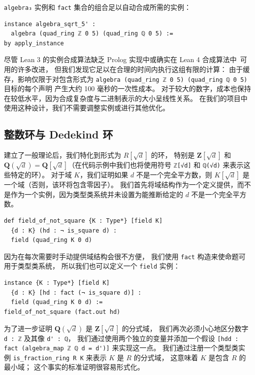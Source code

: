 \documentclass[sigplan,10pt,nonacm,
screen]{acmart} \settopmatter{printfolios=true,printccs=false,printacmref=false}
\newcommand{\QQ}{\mathbf{Q}}
\newcommand{\ZZ}{\mathbf{Z}}
\begin{document}
    \lstinline{algebra₃} 实例和 \lstinline{fact} 集合的组合足以自动合成所需的实例：
\begin{lstlisting}
instance algebra_sqrt_5' :
  algebra (quad_ring ℤ 0 5) (quad_ring ℚ 0 5) :=
by apply_instance
\end{lstlisting}
尽管 Lean 3 的实例合成算法缺乏 Prolog 实现中或确实在 Lean 4 合成算法中~\cite{lean-tabled-typeclasses}可用的许多改进，
但我们发现它足以在合理的时间内执行这组有限的计算：
由于缓存，影响仅限于对包含形式为 \lstinline{algebra (quad_ring ℤ 0 5) (quad_ring ℚ 0 5)} 目标的每个声明
产生大约 100 毫秒的一次性成本。
对于较大的数字，成本也保持在较低水平，因为合成复杂度与二进制表示的大小呈线性关系。
在我们的项目中使用这种设计，我们不需要调整实例或进行其他优化。

    \subsection{整数环与 Dedekind 环} \label{sec:ring_of_integers}

    建立了一般理论后，我们特化到形式为 $R[\sqrt{d}]$ 的环，
特别是 $\ZZ[\sqrt{d}]$ 和 $\QQ(\sqrt{d})=\QQ[\sqrt{d}]$（在代码示例中我们也将使用符号 \lstinline{ℤ[√d]} 和 \lstinline{ℚ(√d)} 来表示这些特定的环）。
    对于域 $K$，我们证明如果 $d$ 不是一个完全平方数，则 $K[\sqrt{d}]$ 是一个域（否则，该环将包含零因子）。
    我们首先将域结构作为一个定义提供，而不是作为一个实例，因为类型类系统并未设置为能推断给定的 $d$ 不是一个完全平方数。
\begin{lstlisting}
def field_of_not_square {K : Type*} [field K]
  {d : K} (hd : ¬ is_square d) :
  field (quad_ring K 0 d)
\end{lstlisting}
    因为在每次需要时手动提供域结构会很不方便，
    我们使用 \lstinline{fact} 构造来使命题可用于类型类系统，
    所以我们也可以定义一个 \lstinline{field} 实例：
\begin{lstlisting}
instance {K : Type*} [field K]
  {d : K} [hd : fact (¬ is_square d)] :
  field (quad_ring K 0 d) :=
field_of_not_square (fact.out hd)
\end{lstlisting}

    为了进一步证明 $\QQ(\sqrt{d})$ 是 $\ZZ[\sqrt{d}]$ 的分式域，
    我们再次必须小心地区分数字 \lstinline{d : ℤ} 及其像 \lstinline{d' : ℚ}，
    我们通过使用两个独立的变量并添加一个假设 \lstinline{[hdd : fact (algebra_map ℤ ℚ d = d')]} 来实现这一点。
    我们通过注册一个类型类实例 \lstinline{is_fraction_ring R K} 来表示 $K$ 是 $R$ 的分式域，
    这意味着 $K$ 是包含 $R$ 的最小域；
    这个事实的标准证明很容易形式化。
\end{document}
